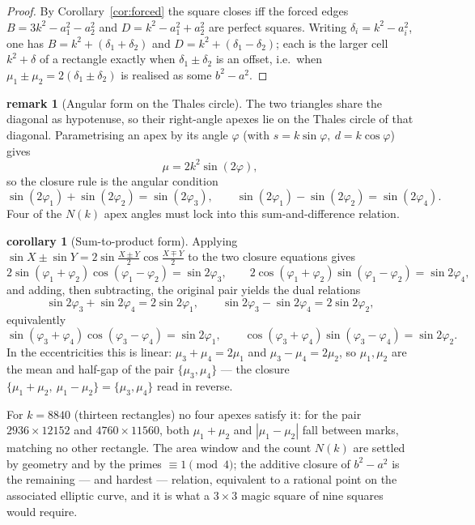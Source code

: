 \documentclass[11pt]{article}
\theoremstyle{definition}
\newtheorem{remark}{remark}
\newtheorem{corollary}{corollary}
\begin{document}
\begin{proof}
By Corollary~\ref{cor:forced} the square closes iff the forced edges
$B=3k^{2}-a_1^{2}-a_2^{2}$ and $D=k^{2}-a_1^{2}+a_2^{2}$ are perfect squares.
Writing $\delta_i=k^{2}-a_i^{2}$, one has $B=k^{2}+(\delta_1+\delta_2)$ and
$D=k^{2}+(\delta_1-\delta_2)$; each is the larger cell $k^{2}+\delta$ of a
rectangle exactly when $\delta_1\pm\delta_2$ is an offset, i.e.\ when
$\mu_1\pm\mu_2=2(\delta_1\pm\delta_2)$ is realised as some $b^{2}-a^{2}$.
\end{proof}

\begin{remark}[Angular form on the Thales circle]
The two triangles share the diagonal as hypotenuse, so their right-angle apexes
lie on the Thales circle of that diagonal. Parametrising an apex by its angle
$\varphi$ (with $s=k\sin\varphi,\ d=k\cos\varphi$) gives
\[
  \mu = 2k^{2}\sin(2\varphi),
\]
so the closure rule is the angular condition
\[
  \sin(2\varphi_1)+\sin(2\varphi_2)=\sin(2\varphi_3),\qquad
  \sin(2\varphi_1)-\sin(2\varphi_2)=\sin(2\varphi_4).
\]
Four of the $N(k)$ apex angles must lock into this sum-and-difference relation.
\end{remark}

\begin{corollary}[Sum-to-product form]\label{cor:sumprod}
Applying $\sin X\pm\sin Y=2\sin\tfrac{X\pm Y}{2}\cos\tfrac{X\mp Y}{2}$ to the two
closure equations gives
\[
  2\sin(\varphi_1+\varphi_2)\cos(\varphi_1-\varphi_2)=\sin2\varphi_3,\qquad
  2\cos(\varphi_1+\varphi_2)\sin(\varphi_1-\varphi_2)=\sin2\varphi_4,
\]
and adding, then subtracting, the original pair yields the dual relations
\[
  \sin2\varphi_3+\sin2\varphi_4=2\sin2\varphi_1,\qquad
  \sin2\varphi_3-\sin2\varphi_4=2\sin2\varphi_2,
\]
equivalently
\[
  \sin(\varphi_3+\varphi_4)\cos(\varphi_3-\varphi_4)=\sin2\varphi_1,\qquad
  \cos(\varphi_3+\varphi_4)\sin(\varphi_3-\varphi_4)=\sin2\varphi_2.
\]
In the eccentricities this is linear: $\mu_3+\mu_4=2\mu_1$ and
$\mu_3-\mu_4=2\mu_2$, so $\mu_1,\mu_2$ are the mean and half-gap of the pair
$\{\mu_3,\mu_4\}$ --- the closure $\{\mu_1+\mu_2,\ \mu_1-\mu_2\}=\{\mu_3,\mu_4\}$
read in reverse.
\end{corollary}

\noindent For $k=8840$ (thirteen rectangles) no four apexes satisfy it: for the
pair $2936\times12152$ and $4760\times11560$, both $\mu_1+\mu_2$ and
$|\mu_1-\mu_2|$ fall between marks, matching no other rectangle. The area window
and the count $N(k)$ are settled by geometry and by the primes $\equiv1\pmod4$;
the additive closure of $b^{2}-a^{2}$ is the remaining --- and hardest ---
relation, equivalent to a rational point on the associated elliptic curve, and it
is what a $3\times3$ magic square of nine squares would require.
\end{document}
